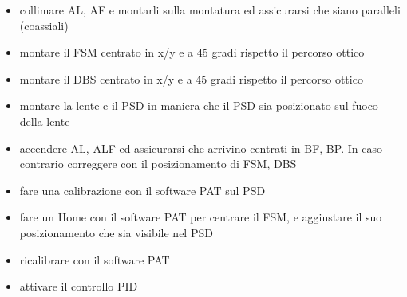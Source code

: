 \begin{itemize}
  \item collimare AL, AF e montarli sulla montatura ed assicurarsi che siano paralleli (coassiali)
  \item montare il FSM centrato in x/y e a 45 gradi rispetto il percorso ottico
  \item montare il DBS centrato in x/y e a 45 gradi rispetto il percorso ottico
  \item montare la lente e il PSD in maniera che il PSD sia posizionato sul fuoco della lente
  \item accendere AL, ALF ed assicurarsi che arrivino centrati in BF, BP. In caso contrario correggere con il posizionamento di FSM, DBS
  \item fare una calibrazione con il software PAT sul PSD
  \item fare un Home con il software PAT per centrare il FSM, e aggiustare il suo posizionamento che sia visibile nel PSD
  \item ricalibrare con il software PAT
  \item attivare il controllo PID
\end{itemize}

